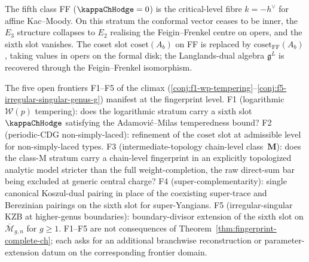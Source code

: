 \begin{remark}
\label{rem:fingerprint-FF-critical}
The fifth class FF ($\kappaChHodge = 0$) is the critical-level fibre
$k = -h^{\vee}$ for affine Kac--Moody. On this stratum the conformal
vector ceases to be inner, the $E_{3}$ structure collapses to $E_{2}$
realising the Feigin--Frenkel centre on opers, and the sixth slot
vanishes. The coset slot $\mathrm{coset}(A_b)$ on FF is replaced by
$\mathrm{coset}_{\mathrm{FF}}(A_b)$, taking values in opers on the
formal disk; the Langlands-dual algebra $\mathfrak{g}^{L}$ is recovered
through the Feigin--Frenkel isomorphism.
\end{remark}

\begin{remark}
\label{rem:fingerprint-five-frontiers}
The five open frontiers F1--F5 of the climax
(\cref{conj:f1-wp-tempering}--\cref{conj:f5-irregular-singular-genus-g})
manifest at the fingerprint level. F1 (logarithmic $\mathcal{W}(p)$
tempering): does the logarithmic stratum carry a sixth slot
$\kappaChHodge$ satisfying the Adamovi\'c--Milas temperedness bound?
F2 (periodic-CDG non-simply-laced): refinement of the $\mathrm{coset}$
slot at admissible level for non-simply-laced types. F3
(intermediate-topology chain-level class~$\mathbf{M}$): does the class-M
stratum carry a chain-level fingerprint in an explicitly topologized
analytic model stricter than the full weight-completion, the raw
direct-sum bar being excluded at generic central charge? F4
(super-complementarity): single canonical Koszul-dual pairing in place
of the coexisting super-trace and Berezinian pairings on the sixth
slot for super-Yangians. F5 (irregular-singular KZB at higher-genus
boundaries): boundary-divisor extension of the sixth slot on
$\overline{\mathcal{M}}_{g, n}$ for $g \ge 1$. F1--F5 are not
consequences of Theorem~\ref{thm:fingerprint-complete-ch}; each asks
for an additional branchwise reconstruction or parameter-extension
datum on the corresponding frontier domain.
\end{remark}
